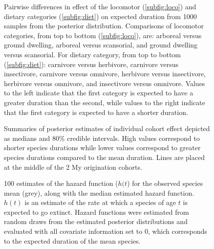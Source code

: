 \documentclass{nature}
\begin{document}
\begin{figure}[ht]
  \label{subfig:loco}
  \label{subfig:diet}
  \caption{Pairwise differences in effect of the locomotor (\ref{subfig:loco}) and dietary categories (\ref{subfig:diet}) on expected duration from 1000 samples from the posterior distribution. Comparisons of locomotor categories, from top to bottom (\ref{subfig:loco}), are: arboreal versus ground dwelling, arboreal versus scansorial, and ground dwelling versus scansorial. For dietary category, from top to bottom (\ref{subfig:diet}): carnivore versus herbivore, carnivore versus insectivore, carnivore versus omnivore, herbivore versus insectivore, herbivore versus omnivore, and insectivore versus omnivore. Values to the left indicate that the first category is expected to have a greater duration than the second, while values to the right indicate that the first category is expected to have a shorter duration.}
  \label{fig:trait_est}
\end{figure}

\begin{figure}[ht]
  \caption{}
  \label{fig:eff_other}
\end{figure}

\begin{figure}[ht]
  \caption{Summaries of posterior estimates of individual cohort effect depicted as medians and 80\% credible intervals. High values correspond to shorter species durations while lower values correspond to greater species durations compared to the mean duration. Lines are placed at the middle of the 2 My origination cohorts.}
  \label{fig:eff_cohort}
\end{figure}

\begin{figure}[ht]
  \caption{100 estimates of the hazard function (\(h(t\)) for the observed species mean (grey), along with the median estimated hazard function. \(h(t)\) is an estimate of the rate at which a species of age \(t\) is expected to go extinct. Hazard functions were estimated from random draws from the estimated posterior distributions and evaluated with all covariate information set to 0, which corresponds to the expected duration of the mean species.}
  \label{fig:haz}
\end{figure}
\end{document}
